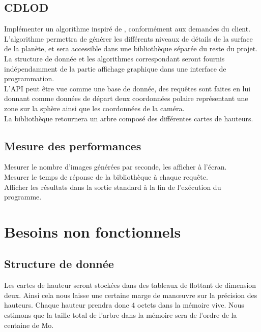 \documentclass[12pt]{report}
\begin{document}
\subsection{CDLOD}

Implémenter un algorithme inspiré de \cite{CDLOD}, conformément aux
demandes du client.\\
L'algorithme permettra de générer les différents niveaux de détails de
la surface de la planète, et sera accessible dans une bibliothèque
séparée du reste du projet.\\
La structure de donnée et les algorithmes correspondant seront fournis
indépendamment de la partie affichage graphique dans une interface de
programmation.\\
L'API peut être vue comme une base de donnée, des requêtes sont faites
en lui donnant comme données de départ deux coordonnées polaire
représentant une zone sur la sphère ainsi que les coordonnées de la
caméra.\\
La bibliothèque retournera un arbre composé des différentes cartes de
hauteurs.\\

\subsection{Mesure des performances}

Mesurer le nombre d'images générées par seconde, les afficher à l'écran.\\
Mesurer le temps de réponse de la bibliothèque à chaque requête.\\
Afficher les résultats dans la sortie standard à la fin de l'exécution
du programme.\\


\section{Besoins non fonctionnels}

\subsection{Structure de donnée}

Les cartes de hauteur seront stockées dans des tableaux de flottant de dimension 
deux. Ainsi cela nous laisse une certaine marge de manœuvre sur la précision des 
hauteurs. Chaque hauteur prendra donc 4 octets dans la mémoire vive. Nous estimons 
que la taille total de l'arbre dans la mémoire sera de l'ordre de la
centaine de Mo.\\
\end{document}
